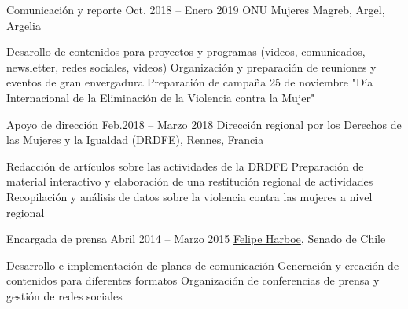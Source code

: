 \begin{joblist}

\item[Comunicación y reporte]{Oct. 2018 -- Enero 2019 }     
	{
	ONU Mujeres Magreb, Argel, Argelia
	}     
	{
		\normalsize{
		\vspace{-0.5cm}
		\begin{itemize}
			  \iftbftiny \setlength\itemsep{-3pt} \fi
			  \cvitem[\checkmark] Desarollo de contenidos para proyectos y programas (videos, comunicados, newsletter, redes sociales, videos)
 			  \cvitem[\checkmark] Organización y preparación de reuniones y eventos de gran envergadura                                                    
			  \cvitem[\checkmark] Preparación de campaña 25 de noviembre "Día Internacional de la Eliminación de la Violencia contra la Mujer"
		\end{itemize}      
        }
	}


\item[Apoyo de dirección]{Feb.2018 -- Marzo 2018 }     
	{
	\tbflogo{../Figure/logo/drdfe_128.png}
	Dirección regional por los Derechos de las Mujeres y la Igualdad (DRDFE), Rennes, Francia
	}     
	{
		\normalsize{            		
		\iftbftiny \vspace{-0.5cm} \fi
		\begin{itemize}
			  \iftbftiny \setlength\itemsep{-3pt} \fi
			  \cvitem[\checkmark] Redacción de artículos sobre las actividades de la DRDFE  
			  \cvitem[\checkmark] Preparación de material interactivo y elaboración de una restitución regional de actividades
			  \cvitem[\checkmark] Recopilación y análisis de datos sobre la violencia contra las mujeres a nivel regional
		\end{itemize}      
        }
	}



\item[Encargada de prensa ]{Abril 2014 -- Marzo 2015}
     {
     \href{https://www.harboe.cl/}{Felipe Harboe}, Senado de Chile
     } 
	 {
		\normalsize{
		\iftbftiny \vspace{-0.5cm} \fi
			\begin{itemize}
			  \iftbftiny \setlength\itemsep{-3pt} \fi
			  \cvitem[\checkmark] Desarrollo e implementación de planes de comunicación
			  \cvitem[\checkmark] Generación y creación de contenidos para diferentes formatos
			  \cvitem[\checkmark] Organización de conferencias de prensa y gestión de redes sociales 
			  

\end{itemize}}}
\end{joblist}

